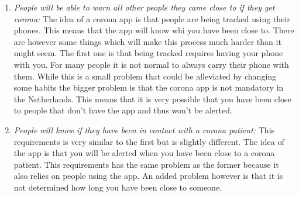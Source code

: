 \documentclass[]{article}
\begin{document}
\begin{enumerate}
    \item \textit{People will be able to warn all other people they came close to
    if they get corona: } The idea of a corona app is that people are being tracked 
    using their phones. This means that the app will know whi you have been close 
    to. There are however some things which will make this process much harder than 
    it might seem. The first one is that being tracked requires having your phone with you. 
    For many people it is not normal to always carry their phone with them. 
    While this is a small problem that could be alleviated by changing some habits
    the bigger problem is that the corona app is not mandatory in the Netherlands.
    This means that it is very possible that you have been close to people that 
    don't have the app and thus won't be alerted.

    \item \textit{People will know if they have been in contact with a corona patient:}
    This requirements is very similar to the first but is slightly different. 
    The idea of the app is that you will be alerted when you have been close to 
    a corona patient. This requirements has the same problem as the former 
    because it also relies on people using the app. An added problem however is 
    that it is not determined how long you have been close to someone. 

\end{enumerate}

\printbibliography
\end{document}
